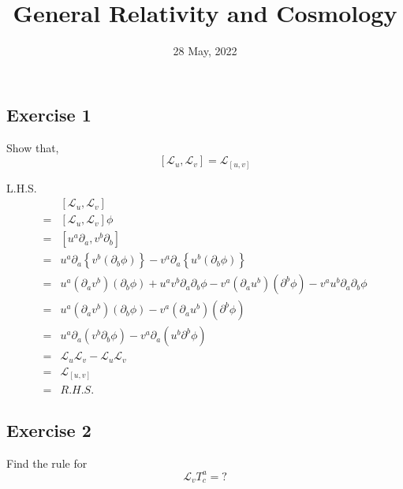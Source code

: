 \documentclass[12pt, letterpaper]{article}
\title {General Relativity and Cosmology}
\author{}
\date{28 May, 2022}
\newcommand*{\1}{\hspace{1pt}}
\begin{document}
    
    \subsection*{Exercise 1}

    Show that,
    \begin{equation*}
        \left[ \mathcal{L} _{u}, \mathcal{L} _{v}\right] = \mathcal{L} _{[u,v]} 
    \end{equation*}

    L.H.S.
    \begin{equation*}
        \begin{split}
        & \left[\mathcal{L} _{u}, \mathcal{L} _{v}\right] \\ 
        = & \left[\mathcal{L} _{u}, \mathcal{L} _{v}\right] \phi \\ 
        = & \left[ u^{a}\partial_{a}, v^{b}\partial_{b}\right] \\ 
        = & u^{a}\partial_{a}\left\{v^{b}\left(\partial_{b}\phi\right)\right\} - v^{a}\partial_{a}\left\{u^{b}\left(\partial_{b}\phi\right)\right\} \\
        = & u^{a}\left(\partial_{a}v^{b}\right)\left(\partial_{b}\phi\right) + u^{a}v^{b}\partial_{a}\partial_{b}\phi - v^{a}\left(\partial_{a}u^{b}\right)\left(\partial^{b}\phi\right) - v^{a}u^{b}\partial_{a}\partial_{b}\phi \\ 
        = & u^{a}\left(\partial_{a}v^{b}\right)\left(\partial_{b}\phi\right) - v^{a}\left(\partial_{a}u^{b}\right)\left(\partial^{b}\phi\right) \\ 
        = & u^{a}\partial_{a}\left(v^{b}\partial_{b}\phi\right) - v^{a}\partial_{a}\left(u^{b} \partial^{b}\phi\right) \\ 
        = & \mathcal{L}_{u}\mathcal{L}_{v} - \mathcal{L}_{u}\mathcal{L}_{v} \\ 
        = & \mathcal{L}_{[u,v]} \\
        = & R.H.S.
        \end{split}
    \end{equation*}

    \subsection*{Exercise 2}
    Find the rule for 
    \begin{equation*}
        \mathcal{L}_{v}T^{a}_{c} = ?
    \end{equation*}
\end{document}
